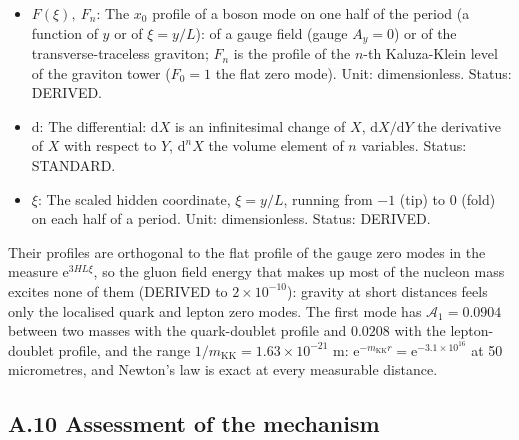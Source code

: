 \documentclass[
  10pt,
]{article}
\begin{document}
\begin{itemize}
  (\(\int_{-1}^{0}\varrho_1\,\mathrm{d}\xi = 1\)): \(L\) times the
  profile \(\varrho_f\) of the zero mode of each source. Unit:
  dimensionless. Status: DERIVED.
\item
  \(F(\xi),\ F_n\): The \(x_0\) profile of a boson mode on one half of
  the period (a function of \(y\) or of \(\xi = y/L\)): of a gauge field
  (gauge \(A_y = 0\)) or of the transverse-traceless graviton; \(F_n\)
  is the profile of the \(n\)-th Kaluza-Klein level of the graviton
  tower (\(F_0 = 1\) the flat zero mode). Unit: dimensionless. Status:
  DERIVED.
\item
  \(\mathrm{d}\): The differential: \(\mathrm{d}X\) is an infinitesimal
  change of \(X\), \(\mathrm{d}X/\mathrm{d}Y\) the derivative of \(X\)
  with respect to \(Y\), \(\mathrm{d}^nX\) the volume element of \(n\)
  variables. Status: STANDARD.
\item
  \(\xi\): The scaled hidden coordinate, \(\xi = y/L\), running from
  \(-1\) (tip) to \(0\) (fold) on each half of a period. Unit:
  dimensionless. Status: DERIVED.
\end{itemize}

Their profiles are orthogonal to the flat profile of the gauge zero
modes in the measure \(\mathrm{e}^{3HL\xi}\), so the gluon field energy
that makes up most of the nucleon mass excites none of them (DERIVED to
\(2\times10^{-10}\)): gravity at short distances feels only the
localised quark and lepton zero modes. The first mode has
\(\mathcal{A}_1 = 0.0904\) between two masses with the quark-doublet
profile and \(0.0208\) with the lepton-doublet profile, and the range
\(1/m_{\mathrm{KK}} = 1.63\times10^{-21}\) m:
\(\mathrm{e}^{-m_{\mathrm{KK}}r} = \mathrm{e}^{-3.1\times10^{16}}\) at
50 micrometres, and Newton's law is exact at every measurable distance.

\hypertarget{a.10-assessment-of-the-mechanism}{%
\subsection*{A.10 Assessment of the
mechanism}\label{a.10-assessment-of-the-mechanism}}
\end{document}
